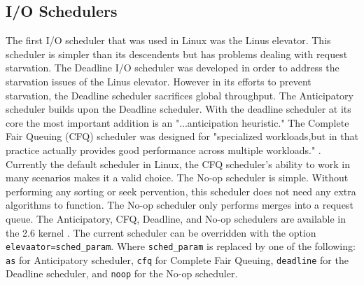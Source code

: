\subsection{I/O Schedulers}
The first I/O scheduler that was used in Linux was the Linus elevator. This scheduler is simpler than its descendents but has problems dealing with request starvation. The Deadline I/O scheduler was developed in order to address the starvation issues of the Linus elevator. However in its efforts to prevent starvation, the Deadline scheduler sacrifices global throughput. The Anticipatory scheduler builds upon the Deadline scheduler. With the deadline scheduler at its core the most important addition is an "...anticipation heuristic." \cite{LinuxTextbook} The Complete  Fair Queuing (CFQ) scheduler was designed for "specialized workloads,but in that practice actually provides good performance across multiple workloads." \cite{LinuxTextbook}. Currently the default scheduler in Linux, the CFQ scheduler's ability to work in  many scenarios makes it a valid choice. The No-op scheduler is simple. Without performing any sorting or seek pervention, this scheduler does not need any extra algorithms to function. The No-op scheduler only performs merges into a request queue. The Anticipatory, CFQ, Deadline, and No-op schedulers are available in the 2.6 kernel \cite{LinuxTextbook}. The current scheduler can be overridden with the option \lstinline{elevaator=sched_param}. Where \lstinline{sched_param} is replaced by one of the following: \lstinline{as} for Anticipatory scheduler, \lstinline{cfq} for Complete Fair Queuing, \lstinline{deadline} for the Deadline scheduler, and \lstinline{noop} for the No-op scheduler.


